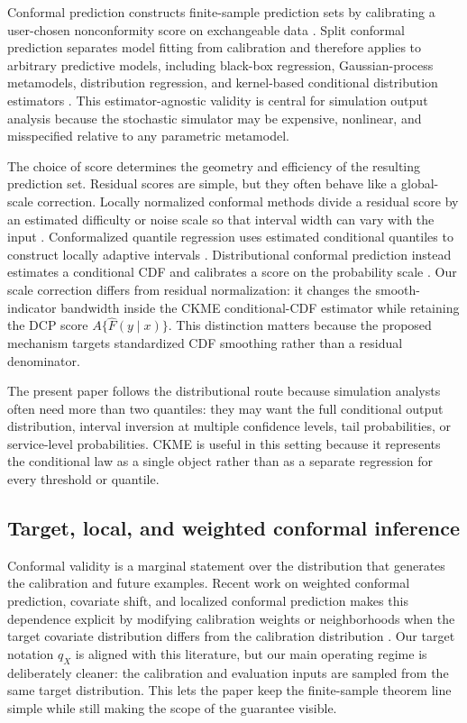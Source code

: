 \documentclass[11pt]{article}
\begin{document}
Conformal prediction constructs finite-sample prediction sets by calibrating a user-chosen nonconformity score on exchangeable data \cite{vovk2005,shafer2008}. Split conformal prediction separates model fitting from calibration and therefore applies to arbitrary predictive models, including black-box regression, Gaussian-process metamodels, distribution regression, and kernel-based conditional distribution estimators \cite{lei2018,angelopoulos2023}. This estimator-agnostic validity is central for simulation output analysis because the stochastic simulator may be expensive, nonlinear, and misspecified relative to any parametric metamodel.

The choice of score determines the geometry and efficiency of the resulting prediction set. Residual scores are simple, but they often behave like a global-scale correction. Locally normalized conformal methods divide a residual score by an estimated difficulty or noise scale so that interval width can vary with the input \cite{papadopoulos2011}. Conformalized quantile regression uses estimated conditional quantiles to construct locally adaptive intervals \cite{romano2019}. Distributional conformal prediction instead estimates a conditional CDF and calibrates a score on the probability scale \cite{chernozhukov2021}. Our scale correction differs from residual normalization: it changes the smooth-indicator bandwidth inside the CKME conditional-CDF estimator while retaining the DCP score \(A\{\widehat F(y\mid x)\}\). This distinction matters because the proposed mechanism targets standardized CDF smoothing rather than a residual denominator.

The present paper follows the distributional route because simulation analysts often need more than two quantiles: they may want the full conditional output distribution, interval inversion at multiple confidence levels, tail probabilities, or service-level probabilities. CKME is useful in this setting because it represents the conditional law as a single object rather than as a separate regression for every threshold or quantile.

\subsection{Target, local, and weighted conformal inference}

Conformal validity is a marginal statement over the distribution that generates the calibration and future examples. Recent work on weighted conformal prediction, covariate shift, and localized conformal prediction makes this dependence explicit by modifying calibration weights or neighborhoods when the target covariate distribution differs from the calibration distribution \cite{tibshirani2019,hore2025}. Our target notation \(q_X\) is aligned with this literature, but our main operating regime is deliberately cleaner: the calibration and evaluation inputs are sampled from the same target distribution. This lets the paper keep the finite-sample theorem line simple while still making the scope of the guarantee visible.
\end{document}
